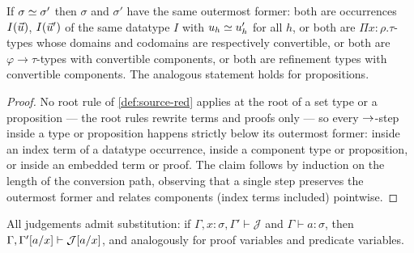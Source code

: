 \begin{lemma}
\label{lem:rigid}
If $\sigma \simeq \sigma'$ then $\sigma$ and $\sigma'$ have the same
outermost former: both are occurrences $I(\vec{u})$, $I(\vec{u}')$ of the
same datatype $I$ with $u_h \simeq u_h'$ for all $h$, or both are $\Pi
x{:}\rho.\tau$-types whose domains and codomains are respectively
convertible, or both are $\varphi \to \tau$-types with convertible
components, or both are refinement types with convertible components.
The analogous statement holds for propositions.
\end{lemma}

\begin{proof}
No root rule of \cref{def:source-red} applies at the root of a set type
or a proposition --- the root rules rewrite terms and proofs only --- so
every $\rightarrow$-step inside a type or proposition happens strictly below its
outermost former: inside an index term of a datatype occurrence, inside a
component type or proposition, or inside an embedded term or proof.  The
claim follows by induction on the length of the conversion path,
observing that a single step preserves the outermost former and relates
components (index terms included) pointwise.
\end{proof}

\begin{lemma}[Substitution]
\label{lem:source-subst}
All judgements admit substitution: if $\Gamma, x{:}\sigma, \Gamma'
\vdash \mathcal{J}$ and $\Gamma \vdash a : \sigma$, then $\Gamma,
\Gamma'[a/x] \vdash \mathcal{J}[a/x]$, and analogously
for proof variables and predicate variables.
\end{lemma}

